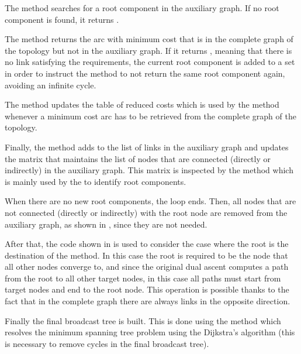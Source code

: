 The  method searches for a root component in the auxiliary
graph. If no root component is found, it returns .

The  method returns the arc with minimum cost that is in the
complete graph of the topology but not in the auxiliary graph. If it returns
, meaning that there is no link satisfying the requirements, the
current root component is added to a set in order to instruct the
 method to not return the same root component again, avoiding
an infinite cycle.

The  method updates the table of reduced costs which is used by
the  method whenever a minimum cost arc has to be retrieved
from the complete graph of the topology.

Finally, the  method adds  to the list of links in
the auxiliary graph and updates the  matrix that maintains the
list of nodes that are connected (directly or indirectly) in the auxiliary
graph. This matrix is inspected by the  method which is
mainly used by the  to identify root components.

When there are no new root components, the loop ends. Then, all nodes that are
not connected (directly or indirectly) with the root node are removed from the
auxiliary graph, as shown in , since they are
not needed.



After that, the code shown in  is used to
consider the case where the root is the destination of the method. In this case
the root is required to be the node that all other nodes converge to, and since
the original dual ascent computes a path from the root to all other target
nodes, in this case all paths must start from target nodes and end to the root
node. This operation is possible thanks to the fact that in the complete graph
there are always links in the opposite direction.



Finally the final broadcast tree is built. This is done using the method
 which resolves the minimum spanning tree problem using
the Dijkstra's algorithm (this is necessary to remove cycles in the final
broadcast tree).
